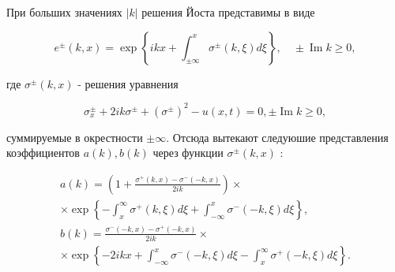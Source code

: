 \documentclass[10pt]{article}
\begin{document}
При больших значениях $|k|$ решения Йоста представимы в виде



\[

e^{ \pm}(k, x)=\exp \left\{i k x+\int_{ \pm \infty}^{x} \sigma^{ \pm}(k, \xi) d \xi\right\}, \quad \pm \operatorname{Im} k \geqslant 0,

\]



где $\sigma^{ \pm}(k, x)$ - решения уравнения



\[

\sigma_{x}^{ \pm}+2 i k \sigma^{ \pm}+\left(\sigma^{ \pm}\right)^{2}-u(x, t)=0, \pm \operatorname{Im} k \geqslant 0,

\]



суммируемые в окрестности $\pm \infty$. Отсюда вытекают следуюшие представления коэффициентов $a(k), b(k)$ через функции $\sigma^{ \pm}(k, x)$ :



\[

\begin{gathered}

a(k)=\left(1+\frac{\sigma^{+}(k, x)-\sigma^{-}(-k, x)}{2 i k}\right) \times \\

\times \exp \left\{-\int_{x}^{\infty} \sigma^{+}(k, \xi) d \xi+\int_{-\infty}^{x} \sigma^{-}(-k, \xi) d \xi\right\}, \\

b(k)=\frac{\sigma^{-}(-k, x)-\sigma^{+}(-k, x)}{2 i k} \times \\

\times \exp \left\{-2 i k x+\int_{-\infty}^{x} \sigma^{-}(-k, \xi) d \xi-\int_{x}^{\infty} \sigma^{+}(-k, \xi) d \xi\right\} .

\end{gathered}

\]
\end{document}
